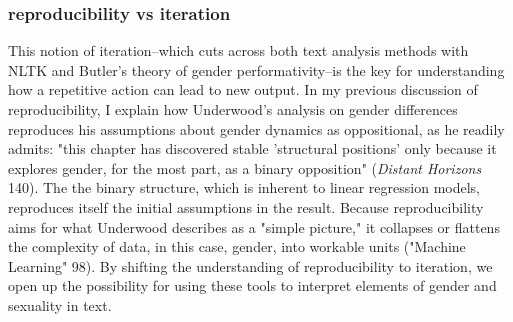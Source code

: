 \documentclass[11pt]{article}
\begin{document}
\subsubsection{reproducibility vs iteration}
\label{sec:orgd7194d3}
This notion of iteration--which cuts across both text analysis methods
with NLTK and Butler's theory of gender performativity--is the key for
understanding how a repetitive action can lead to new output. In my
previous discussion of reproducibility, I explain how Underwood's
analysis on gender differences reproduces his assumptions about gender
dynamics as oppositional, as he readily admits: "this chapter has
discovered stable 'structural positions' only because it explores
gender, for the most part, as a binary opposition" (\emph{Distant Horizons}
140). The the binary structure, which is inherent to linear regression
models, reproduces itself the initial assumptions in the
result. Because reproducibility aims for what Underwood describes as a
"simple picture," it collapses or flattens the complexity of data, in
this case, gender, into workable units ("Machine Learning" 98). By
shifting the understanding of reproducibility to iteration, we open up
the possibility for using these tools to interpret elements of gender
and sexuality in text.
\end{document}
